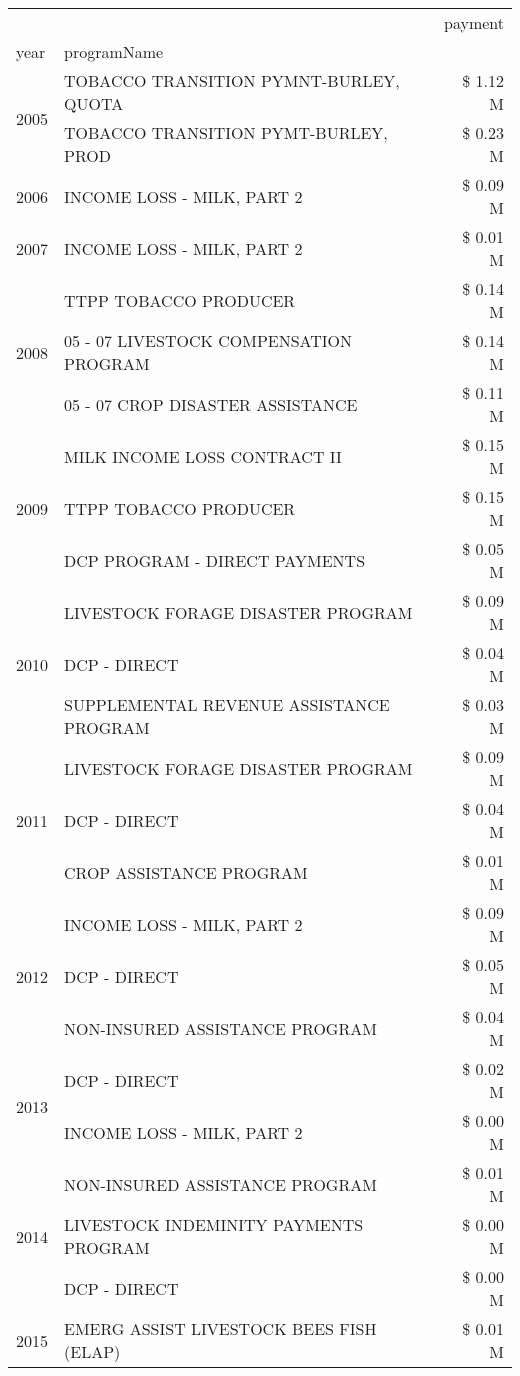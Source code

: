 \begin{tabular}{llr}
\toprule
 &  & payment \\
year & programName &  \\
\midrule
\multirow[t]{2}{*}{2005} & TOBACCO TRANSITION PYMNT-BURLEY, QUOTA & \$ 1.12 M \\
 & TOBACCO TRANSITION PYMT-BURLEY, PROD & \$ 0.23 M \\
\cline{1-3}
2006 & INCOME LOSS - MILK, PART 2 & \$ 0.09 M \\
\cline{1-3}
2007 & INCOME LOSS - MILK, PART 2 & \$ 0.01 M \\
\cline{1-3}
\multirow[t]{3}{*}{2008} & TTPP TOBACCO PRODUCER & \$ 0.14 M \\
 & 05 - 07 LIVESTOCK COMPENSATION PROGRAM & \$ 0.14 M \\
 & 05 - 07 CROP DISASTER ASSISTANCE & \$ 0.11 M \\
\cline{1-3}
\multirow[t]{3}{*}{2009} & MILK INCOME LOSS CONTRACT II & \$ 0.15 M \\
 & TTPP TOBACCO PRODUCER & \$ 0.15 M \\
 & DCP PROGRAM - DIRECT PAYMENTS & \$ 0.05 M \\
\cline{1-3}
\multirow[t]{3}{*}{2010} & LIVESTOCK FORAGE DISASTER PROGRAM & \$ 0.09 M \\
 & DCP - DIRECT & \$ 0.04 M \\
 & SUPPLEMENTAL REVENUE ASSISTANCE PROGRAM & \$ 0.03 M \\
\cline{1-3}
\multirow[t]{3}{*}{2011} & LIVESTOCK FORAGE DISASTER PROGRAM & \$ 0.09 M \\
 & DCP - DIRECT & \$ 0.04 M \\
 & CROP ASSISTANCE PROGRAM & \$ 0.01 M \\
\cline{1-3}
\multirow[t]{3}{*}{2012} & INCOME LOSS - MILK, PART 2 & \$ 0.09 M \\
 & DCP - DIRECT & \$ 0.05 M \\
 & NON-INSURED ASSISTANCE PROGRAM & \$ 0.04 M \\
\cline{1-3}
\multirow[t]{2}{*}{2013} & DCP - DIRECT & \$ 0.02 M \\
 & INCOME LOSS - MILK, PART 2 & \$ 0.00 M \\
\cline{1-3}
\multirow[t]{3}{*}{2014} & NON-INSURED ASSISTANCE PROGRAM & \$ 0.01 M \\
 & LIVESTOCK INDEMINITY PAYMENTS PROGRAM & \$ 0.00 M \\
 & DCP - DIRECT & \$ 0.00 M \\
\cline{1-3}
\multirow[t]{2}{*}{2015} & EMERG ASSIST LIVESTOCK BEES FISH (ELAP) & \$ 0.01 M \\

\end{tabular}

